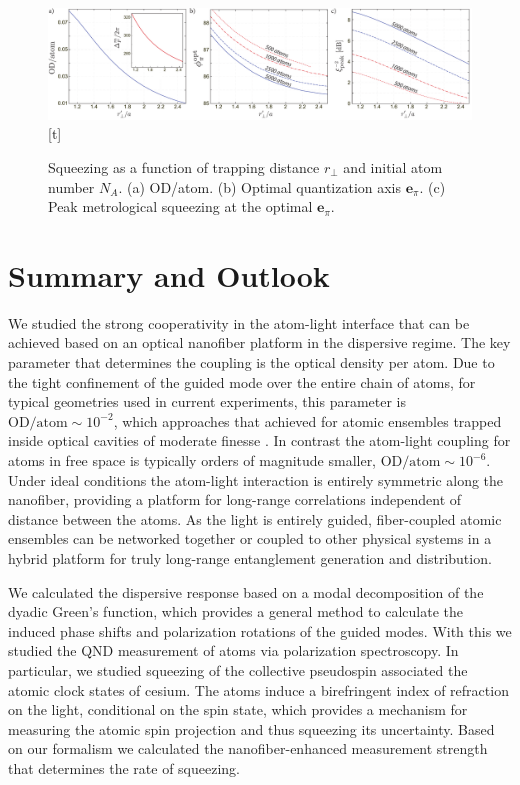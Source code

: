 \documentclass[preprint, aps,pra,onecolumn]{revtex4-1} %
\newcommand{\qaxis}{\mathbf{e}_\pi}
\begin{document}
\begin{figure}\includegraphics[scale=0.4]{./Figs/Fig_SqueezingDistance}[t]
\caption{Squeezing as a function of trapping distance $r_\perp$ and initial atom number $N_A$. (a) OD/atom. (b) Optimal quantization axis $\qaxis$. 
(c) Peak metrological squeezing at the optimal $\qaxis$.} \label{Fig::Squeezing_Distance}
\end{figure}


\section{Summary and Outlook} \label{Sec::Conclusion}

We studied the strong cooperativity in the atom-light interface that can be achieved based on an optical nanofiber platform in the dispersive regime.  
The key parameter that determines the coupling is the optical density per atom.  
Due to the tight confinement of the guided mode over the entire chain of atoms, for typical geometries used in current experiments, this parameter is $ \mathrm{OD}/\mathrm{atom}\sim 10^{-2} $, which approaches that achieved for atomic ensembles trapped inside optical cavities of moderate finesse \cite{chen_conditional_2011, zhang_collective_2012}.  
In contrast the atom-light coupling for atoms in free space is typically orders of magnitude smaller, $ \mathrm{OD}/\mathrm{atom} \sim 10^{-6}$.  
Under ideal conditions the atom-light interaction is entirely symmetric along the nanofiber, providing a platform for long-range correlations independent of distance between the atoms. 
As the light is entirely guided, fiber-coupled atomic ensembles can be networked together or coupled to other physical systems in a hybrid platform \cite{hafezi_atomic_2012, liebermeister_tapered_2014} for truly long-range entanglement generation and distribution. 

We calculated the dispersive response based on a modal decomposition of the dyadic Green's function, which provides a general method to calculate the induced phase shifts and polarization rotations of the guided modes. 
With this we studied the QND measurement of atoms via polarization spectroscopy. 
In particular, we studied squeezing of the collective pseudospin associated the atomic clock states of cesium. 
The atoms induce a birefringent index of refraction on the light, conditional on the spin state, which provides a mechanism for measuring the atomic spin projection and thus squeezing its uncertainty.  
Based on our formalism we calculated the nanofiber-enhanced measurement strength that determines the rate of squeezing.  
\end{document}
